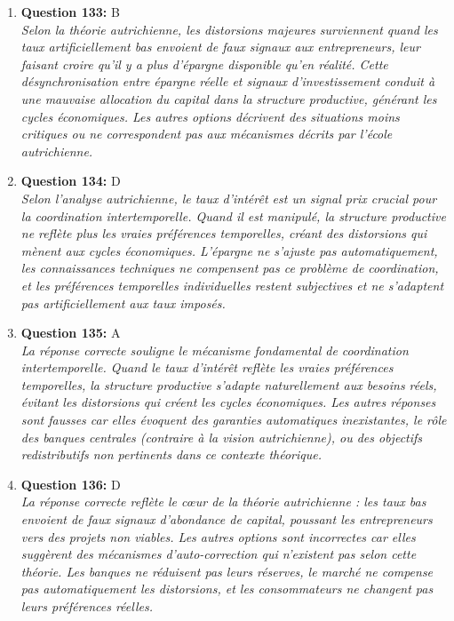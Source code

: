 \documentclass[12pt,a4paper]{article}
\begin{document}
\begin{enumerate}
\item \textbf{Question 133:} B
\\ \textit{Selon la théorie autrichienne, les distorsions majeures surviennent quand les taux artificiellement bas envoient de faux signaux aux entrepreneurs, leur faisant croire qu'il y a plus d'épargne disponible qu'en réalité. Cette désynchronisation entre épargne réelle et signaux d'investissement conduit à une mauvaise allocation du capital dans la structure productive, générant les cycles économiques. Les autres options décrivent des situations moins critiques ou ne correspondent pas aux mécanismes décrits par l'école autrichienne.}

\item \textbf{Question 134:} D
\\ \textit{Selon l'analyse autrichienne, le taux d'intérêt est un signal prix crucial pour la coordination intertemporelle. Quand il est manipulé, la structure productive ne reflète plus les vraies préférences temporelles, créant des distorsions qui mènent aux cycles économiques. L'épargne ne s'ajuste pas automatiquement, les connaissances techniques ne compensent pas ce problème de coordination, et les préférences temporelles individuelles restent subjectives et ne s'adaptent pas artificiellement aux taux imposés.}

\item \textbf{Question 135:} A
\\ \textit{La réponse correcte souligne le mécanisme fondamental de coordination intertemporelle. Quand le taux d'intérêt reflète les vraies préférences temporelles, la structure productive s'adapte naturellement aux besoins réels, évitant les distorsions qui créent les cycles économiques. Les autres réponses sont fausses car elles évoquent des garanties automatiques inexistantes, le rôle des banques centrales (contraire à la vision autrichienne), ou des objectifs redistributifs non pertinents dans ce contexte théorique.}

\item \textbf{Question 136:} D
\\ \textit{La réponse correcte reflète le cœur de la théorie autrichienne : les taux bas envoient de faux signaux d'abondance de capital, poussant les entrepreneurs vers des projets non viables. Les autres options sont incorrectes car elles suggèrent des mécanismes d'auto-correction qui n'existent pas selon cette théorie. Les banques ne réduisent pas leurs réserves, le marché ne compense pas automatiquement les distorsions, et les consommateurs ne changent pas leurs préférences réelles.}


\end{enumerate}
\end{document}
